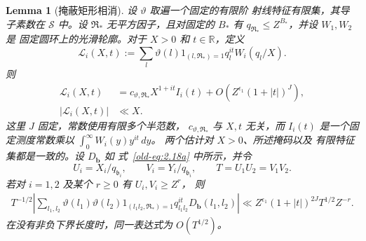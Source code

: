 \documentclass[11pt,a4paper]{article}
\numberwithin{equation}{section}
\numberwithin{figure}{section}
\newtheorem{lemma}[theorem]{Lemma}
\theoremstyle{definition}
\theoremstyle{remark}
\begin{document}
\begin{lemma}[掩蔽矩形相消]
\label{lem:centered-lattice-cancellation}
设 \(\vartheta\) 取遍一个固定的有限阶
射线特征有限集，其导子素数在 \(\mathcal S\) 中。设
\(\mathfrak R_*\) 无平方因子，且对固定的 \(B_*\) 有 \(q_{\mathfrak R_*}\le Z^{B_*}\)，并设 \(W_1,W_2\) 是
固定圆环上的光滑轮廓。对于 \(X>0\) 和 \(t\in\mathbb R\)，定义
\[
 \mathcal L_i(X,t):=
 \sum_l\vartheta(l)1_{(l,\mathfrak R_*)=1}
           q_l^{it}W_i(q_l/X).
\]
则
\begin{align}
 \mathcal L_i(X,t)
 &=c_{\vartheta,\mathfrak R_*}X^{1+it}I_i(t)
   +O\left(Z^{\epsilon_1}(1+|t|)^J\right),
 \label{old-eq:2.18d}\\
 |\mathcal L_i(X,t)|&\ll X.
 \label{old-eq:2.18e}
\end{align}
这里 \(J\) 固定，常数使用有限多个半范数，
\(c_{\vartheta,\mathfrak R_*}\) 与 \(X,t\) 无关，而
\(I_i(t)\) 是一个固定测度常数乘以
\(\int_0^\infty W_i(y)y^{it}\,dy\)。
两个估计对 \(X>0\)、所述掩码以及
有限特征集都是一致的。设 \(D_{\mathbf b}\) 如
式~\eqref{old-eq:2.18a} 中所示，并令
\[
 U_i=X_i/q_{\mathfrak b_i},\qquad
 V_i=Y_i/q_{\mathfrak b_i},\qquad
 T=U_1U_2=V_1V_2.
\]
若对 \(i=1,2\) 及某个 \(r\ge0\) 有 \(U_i,V_i\ge Z^r\)，
则
\begin{equation}
 \begin{split}
 T^{-1/2}\left|
 \sum_{l_1,l_2}
 \vartheta(l_1)\vartheta(l_2)
 1_{(l_1l_2,\mathfrak R_*)=1}
 q_{l_1l_2}^{it}D_{\mathbf b}(l_1,l_2)
 \right|
 \ll Z^{\epsilon_1}(1+|t|)^{2J}T^{1/2}Z^{-r}.
 \end{split}
 \label{old-eq:2.18f}
\end{equation}
在没有非负下界长度时，同一表达式为
\(O(T^{1/2})\)。
\end{lemma}
\end{document}

